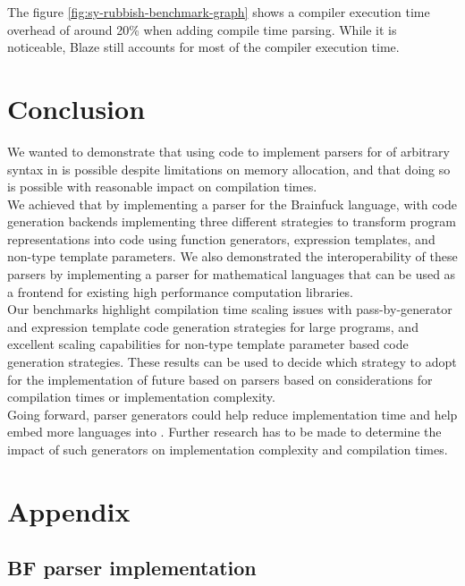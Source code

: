 \documentclass[../../main.tex]{subfiles}
\begin{document}
The figure \ref{fig:sy-rubbish-benchmark-graph} shows a compiler execution time
overhead of around 20\% when adding compile time parsing.
While it is noticeable, Blaze still accounts for most of the compiler execution
time.

\section{Conclusion}

We wanted to demonstrate that using \constexpr code to implement parsers for
\dsel of arbitrary syntax in  is possible despite limitations on
\constexpr memory allocation, and that doing so is possible with reasonable
impact on compilation times.\\

We achieved that by implementing a \constexpr parser for the Brainfuck language,
with code generation backends implementing three different strategies to
transform \constexpr program representations into code using function
generators, expression templates, and non-type template parameters.
We also demonstrated the interoperability of these \constexpr parsers by
implementing a parser for mathematical languages that can be used as a frontend
for existing high performance \cpp computation libraries.\\

Our benchmarks highlight compilation time scaling issues with pass-by-generator
and expression template code generation strategies for large programs, and
excellent scaling capabilities for non-type template parameter based code
generation strategies. These results can be used to decide which strategy to
adopt for the implementation of future \dsel based on \constexpr parsers
based on considerations for compilation times or implementation complexity.\\

Going forward, \constexpr parser generators could help reduce
\dsel implementation time and help embed more languages into . Further research
has to be made to determine the impact of such generators on
\dsel implementation complexity and compilation times.


\appendix
\section{Appendix}

\subsection{BF parser implementation}\label{app:bf-parser}


\end{document}
